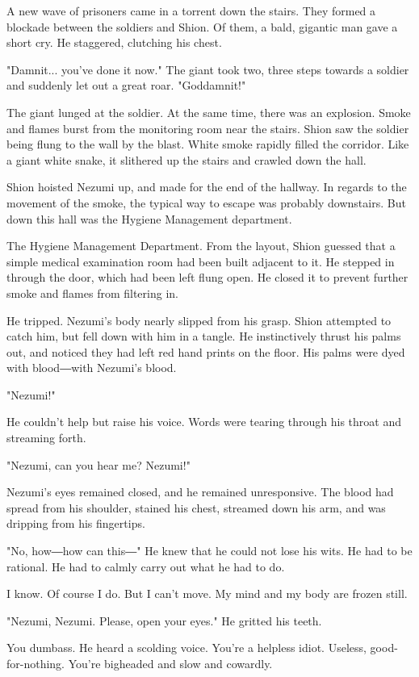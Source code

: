 A new wave of prisoners came in a torrent down the stairs. They formed a
blockade between the soldiers and Shion. Of them, a bald, gigantic man
gave a short cry. He staggered, clutching his chest.

"Damnit... you've done it now." The giant took two, three steps towards
a soldier and suddenly let out a great roar. "Goddamnit!"

The giant lunged at the soldier. At the same time, there was an
explosion. Smoke and flames burst from the monitoring room near the
stairs. Shion saw the soldier being flung to the wall by the blast.
White smoke rapidly filled the corridor. Like a giant white snake, it
slithered up the stairs and crawled down the hall.

Shion hoisted Nezumi up, and made for the end of the hallway. In regards
to the movement of the smoke, the typical way to escape was probably
downstairs. But down this hall was the Hygiene Management department.

The Hygiene Management Department. From the layout, Shion guessed that a
simple medical examination room had been built adjacent to it. He
stepped in through the door, which had been left flung open. He closed
it to prevent further smoke and flames from filtering in.

He tripped. Nezumi's body nearly slipped from his grasp. Shion attempted
to catch him, but fell down with him in a tangle. He instinctively
thrust his palms out, and noticed they had left red hand prints on the
floor. His palms were dyed with blood―with Nezumi's blood.

"Nezumi!"

He couldn't help but raise his voice. Words were tearing through his
throat and streaming forth.

"Nezumi, can you hear me? Nezumi!"

Nezumi's eyes remained closed, and he remained unresponsive. The blood
had spread from his shoulder, stained his chest, streamed down his arm,
and was dripping from his fingertips.

"No, how―how can this―" He knew that he could not lose his wits. He had
to be rational. He had to calmly carry out what he had to do.

I know. Of course I do. But I can't move. My mind and my body are frozen
still.

"Nezumi, Nezumi. Please, open your eyes." He gritted his teeth.

You dumbass. He heard a scolding voice. You're a helpless idiot.
Useless, good-for-nothing. You're bigheaded and slow and cowardly.

